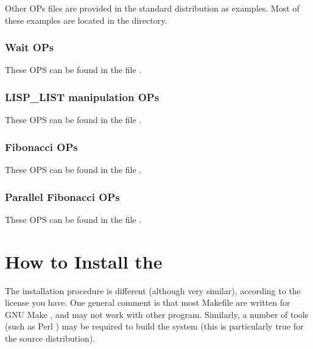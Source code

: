 Other OPs files are provided in the standard distribution as examples. Most of
these examples are located in the  directory.



\subsection{Wait OPs}

These OPS can be found in the file .



\subsection{LISP\_LIST manipulation OPs}

These OPS can be found in the file .



\subsection{Fibonacci OPs}

These OPS can be found in the file .



\subsection{Parallel Fibonacci OPs}

These OPS can be found in the file .



\chapter{How to Install the \COPRSDE{}}

The installation procedure is different (although very similar), according to
the license you have. One general comment is that most Makefile are written for
GNU Make \cite{GNU-make-manual}, and may not work with other 
program. Similarly, a number of tools (such as Perl \cite{perl-manual}) may be
required to build the system (this is particularly true for the source
distribution).



